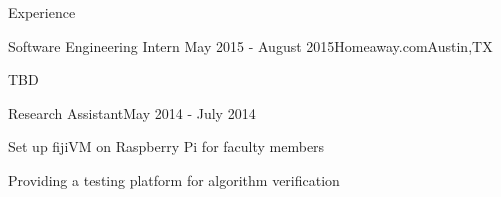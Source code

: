 \documentclass{resume} %
\begin{document}
\begin{rSection}{Experience}

\begin{rSubsection}{Software Engineering Intern }{May 2015 - August 2015}{Homeaway.com}{Austin,TX}
\item TBD
\end{rSubsection}


\begin{rSubsection}{Research Assistant}{May 2014 - July 2014}{}{}
\item Set up fijiVM on Raspberry Pi for faculty members
\item Providing a testing platform for algorithm verification 
\end{rSubsection}

\end{rSection}


\end{document}
